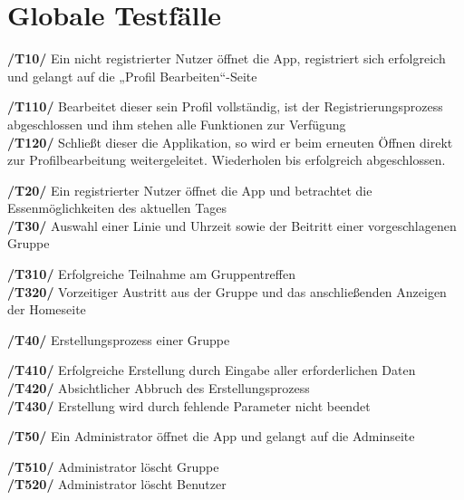 \documentclass[a4paper]{scrreprt}
\begin{document}
\chapter{Globale Testfälle}
\begin{addmargin}[25pt]{0pt} 
\textbf{/T10/} Ein nicht registrierter Nutzer öffnet die App, registriert sich erfolgreich und gelangt auf die „Profil Bearbeiten“-Seite\\
  \begin{addmargin}[25pt]{0pt} 
  \textbf{/T110/} Bearbeitet dieser sein Profil vollständig, ist der Registrierungsprozess abgeschlossen und ihm stehen alle Funktionen zur Verfügung\\
  \textbf{/T120/} Schließt dieser die Applikation, so wird er beim erneuten Öffnen direkt zur Profilbearbeitung weitergeleitet. Wiederholen bis erfolgreich abgeschlossen.\\
  \end{addmargin}
\textbf{/T20/}  Ein registrierter Nutzer öffnet die App und betrachtet die Essenmöglichkeiten des aktuellen Tages\\
\textbf{/T30/} Auswahl einer Linie und Uhrzeit sowie der Beitritt einer vorgeschlagenen Gruppe\\
  \begin{addmargin}[25pt]{0pt} 
  \textbf{/T310/} Erfolgreiche Teilnahme am Gruppentreffen\\
  \textbf{/T320/} Vorzeitiger Austritt aus der Gruppe und das anschließenden Anzeigen der Homeseite\\
  \end{addmargin}
\textbf{/T40/}  Erstellungsprozess einer Gruppe\\
  \begin{addmargin}[25pt]{0pt} 
  \textbf{/T410/} Erfolgreiche Erstellung durch Eingabe aller erforderlichen Daten\\
  \textbf{/T420/} Absichtlicher Abbruch des Erstellungsprozess\\
  \textbf{/T430/} Erstellung wird durch fehlende Parameter nicht beendet\\
  \end{addmargin}
\textbf{/T50/} Ein Administrator öffnet die App und gelangt auf die Adminseite\\
  \begin{addmargin}[25pt]{0pt} 
  \textbf{/T510/} Administrator löscht Gruppe\\
  \textbf{/T520/} Administrator löscht Benutzer\\
  \end{addmargin}



\end{addmargin}
\end{document}
